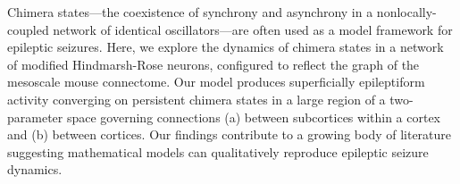 Chimera states---the coexistence of synchrony and asynchrony in a nonlocally-coupled network of identical oscillators---are often used as a model framework for epileptic seizures.
Here, we explore the dynamics of chimera states in a network of modified Hindmarsh-Rose neurons, configured to reflect the graph of the mesoscale mouse connectome.
Our model produces superficially epileptiform activity converging on persistent chimera states in a large region of a two-parameter space governing connections (a) between subcortices within a cortex and (b) between cortices.
Our findings contribute to a growing body of literature suggesting mathematical models can qualitatively reproduce epileptic seizure dynamics.

